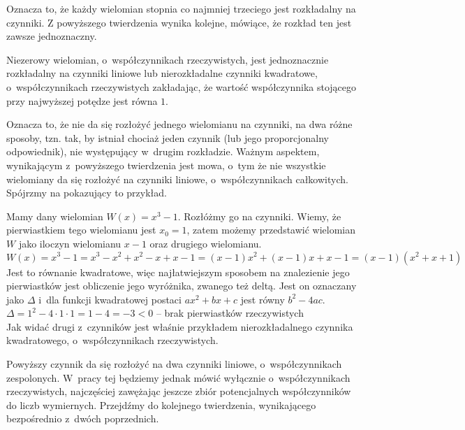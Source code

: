 Oznacza to, że każdy wielomian stopnia co najmniej trzeciego jest rozkładalny na czynniki. Z powyższego twierdzenia wynika kolejne, mówiące, że rozkład ten jest zawsze jednoznaczny.

\begin{theorem}
	$ $\\
	Niezerowy wielomian, o~współczynnikach rzeczywistych, jest jednoznacznie rozkładalny na czynniki liniowe lub nierozkładalne czynniki kwadratowe, o~współczynnikach rzeczywistych zakładając, że wartość współczynnika stojącego przy najwyższej potędze jest równa $1$.
\end{theorem}

Oznacza to, że nie da się rozłożyć jednego wielomianu na czynniki, na dwa różne sposoby, tzn. tak, by istniał chociaż jeden czynnik (lub jego proporcjonalny odpowiednik), nie występujący w~drugim rozkładzie. Ważnym aspektem, wynikającym z~powyższego twierdzenia jest mowa, o~tym że nie wszystkie wielomiany da się rozłożyć na czynniki liniowe, o~współczynnikach całkowitych. Spójrzmy na pokazujący to przykład.

\begin{example}
	$ $\\
	Mamy dany wielomian $W(x)=x^3-1$. Rozłóżmy go na czynniki.
	Wiemy, że pierwiastkiem tego wielomianu jest $x_0 = 1$, zatem możemy przedstawić wielomian $W$ jako iloczyn wielomianu $x-1$ oraz drugiego wielomianu.
	\begin{equation*}
	W(x)=x^3-1=x^3-x^2+x^2-x+x-1=(x-1)x^2+(x-1)x+x-1 = (x-1)(x^2+x+1)
	\end{equation*}
	Jest to równanie kwadratowe, więc najłatwiejszym sposobem na znalezienie jego pierwiastków jest obliczenie jego wyróżnika, zwanego też deltą. Jest on oznaczany jako $\Delta$ i~dla funkcji kwadratowej postaci $ax^2+bx+c$ jest równy $b^2-4ac$. \\
	$\Delta = 1^2 - 4 \cdot 1 \cdot 1 = 1 - 4 = -3 < 0$ -- brak pierwiastków rzeczywistych\\
	Jak widać drugi z~czynników jest właśnie przykładem nierozkładalnego czynnika kwadratowego, o~współczynnikach rzeczywistych.
\end{example}

Powyższy czynnik da się rozłożyć na dwa czynniki liniowe, o~współczynnikach zespolonych. W~pracy tej będziemy jednak mówić wyłącznie o~współczynnikach rzeczywistych, najczęściej zawężając jeszcze zbiór potencjalnych współczynników do liczb wymiernych. Przejdźmy do kolejnego twierdzenia, wynikającego bezpośrednio z~dwóch poprzednich.


